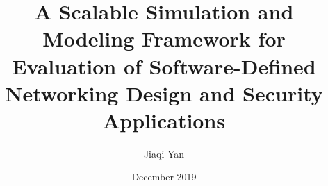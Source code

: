 \documentclass{iitthesis}
\theoremstyle{definition}
\begin{document}
\title{A Scalable Simulation and Modeling Framework for Evaluation of
Software-Defined Networking Design and Security Applications
}
\author{Jiaqi Yan}
\date{December 2019}
\maketitle                %


\prelimpages         %




\tableofcontents
\clearpage

\listoftables

\clearpage

\listoffigures

\clearpage



\clearpage
\end{document}
